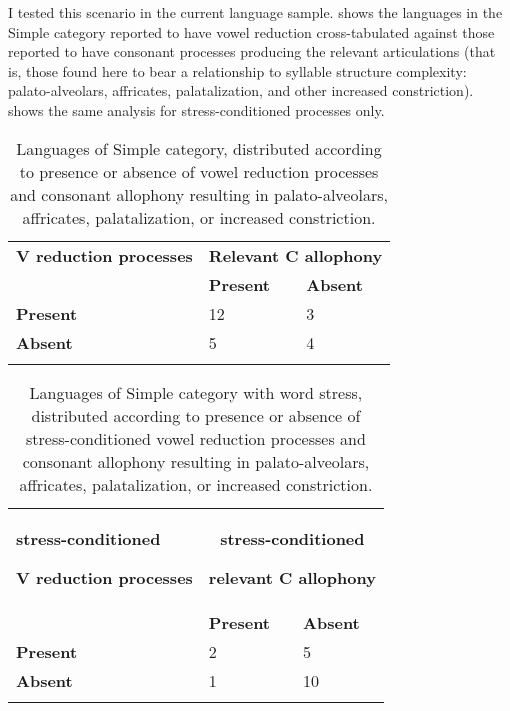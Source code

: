   I tested this scenario in the current language sample.  shows the languages in the Simple category reported to have vowel reduction cross-tabulated against those reported to have consonant processes producing the relevant articulations (that is, those found here to bear a relationship to syllable structure complexity: palato-alveolars, affricates, palatalization, and other increased constriction).  shows the same analysis for stress-conditioned processes only.

\begin{table}
\begin{tabularx}{\textwidth}{XXX}
\lsptoprule
 \textbf{V reduction processes} & \multicolumn{2}{c}{ \textbf{Relevant C allophony}}\\
\hhline{-~~} & \textbf{Present} & \textbf{Absent}\\
 \textbf{Present} & 12 & 3\\
 \textbf{Absent} & 5 & 4\\
\lspbottomrule
\end{tabularx}
\caption{\label{tab:7.10}Languages of Simple category, distributed according to presence or absence of vowel reduction processes and consonant allophony resulting in palato-alveolars, affricates, palatalization, or increased constriction.}
\end{table}




\begin{table}
\begin{tabularx}{\textwidth}{XXX}
\lsptoprule
{ \textbf{stress-conditioned}}

 \textbf{V reduction processes} & \multicolumn{2}{c}{{ \textbf{stress-conditioned} }

 \textbf{relevant C allophony}}\\
\hhline{-~~} & \textbf{Present} & \textbf{Absent}\\
 \textbf{Present} & 2 & 5\\
 \textbf{Absent} & 1 & 10\\
\lspbottomrule
\end{tabularx}
\caption{\label{tab:7.11}Languages of Simple category with word stress, distributed according to presence or absence of stress-conditioned vowel reduction processes and consonant allophony resulting in palato-alveolars, affricates, palatalization, or increased constriction.}
\end{table}

